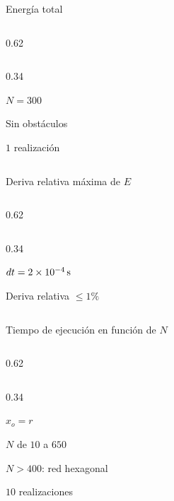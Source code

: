 \begin{frame}{Energía total}
  \begin{cols}
    \begin{column}{0.62\textwidth}
    \end{column}
    \begin{column}{0.34\textwidth}
      \begin{parametros}
        \item $N = 300$
        \item Sin obstáculos
        \item $1$ realización
      \end{parametros}
    \end{column}
  \end{cols}
\end{frame}

\begin{frame}{Deriva relativa máxima de $E$}
  \begin{cols}
    \begin{column}{0.62\textwidth}
    \end{column}
    \begin{column}{0.34\textwidth}
      \begin{resultado}
        \item $dt = 2\times 10^{-4}\,\mathrm{s}$
        \item Deriva relativa $\leq 1\%$
      \end{resultado}
    \end{column}
  \end{cols}
\end{frame}

\begin{frame}{Tiempo de ejecución en función de $N$}
  \begin{cols}
    \begin{column}{0.62\textwidth}
    \end{column}
    \begin{column}{0.34\textwidth}
      \begin{parametros}
        \item $x_o = r$
        \item $N$ de $10$ a $650$
        \item $N > 400$: red hexagonal
        \item $10$ realizaciones
      \end{parametros}
    \end{column}
  \end{cols}
\end{frame}
